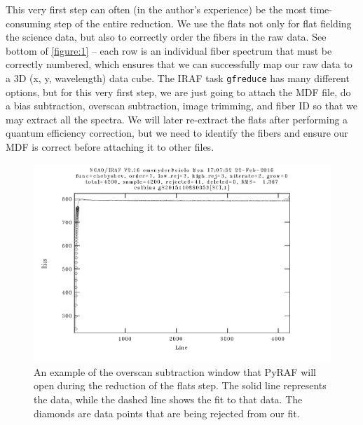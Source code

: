 \documentclass[12pt]{report}
\begin{document}
\noindent This very first step can often (in the author's experience) be the most time-consuming step of the entire reduction. We use the flats not only for flat fielding the science data, but also to correctly order the fibers in the raw data. See bottom of \autoref{figure:1} -- each row is an individual fiber spectrum that must be correctly numbered, which ensures that we can successfully map our raw data to a 3D (x, y, wavelength) data cube. The IRAF task \texttt{gfreduce} has many different options, but for this very first step, we are just going to attach the MDF file, do a bias subtraction, overscan subtraction, image trimming, and fiber ID so that we may extract all the spectra. We will later re-extract the flats after performing a quantum efficiency correction, but we need to identify the fibers and ensure our MDF is correct before attaching it to other files.

\begin{figure}[h]
\centering
\includegraphics{overscan_example}
\caption[Overscan Subtraction Example]{An example of the overscan subtraction window that PyRAF will open during the reduction of the flats step. The solid line represents the data, while the dashed line shows the fit to that data. The diamonds are data points that are being rejected from our fit.}
\label{fig:overscan}
\end{figure}
\end{document}
